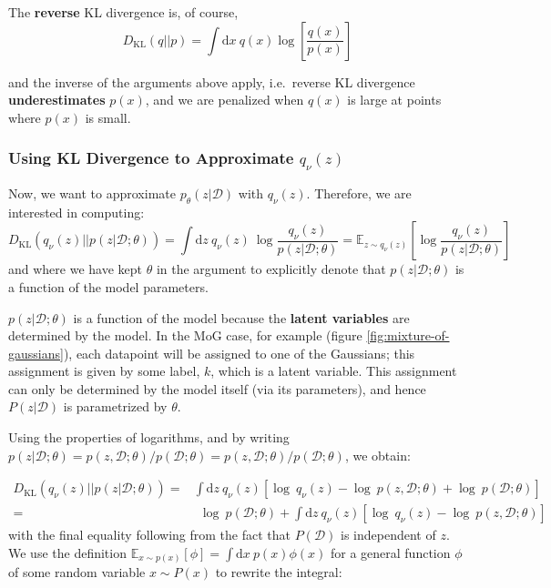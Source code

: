 \documentclass[]{article}
\begin{document}
The \textbf{reverse} KL divergence is, of course,
\begin{equation}\label{eq:backwards_kl}
    D_\text{KL}(q||p) = \int \text{d}x~ q(x)\log\left[\frac{q(x)}{p(x)}\right]
\end{equation}

and the inverse of the arguments above apply, i.e.\ reverse KL divergence \textbf{underestimates} $p(x)$, and we are penalized when $q(x)$ is large at points where $p(x)$ is small.

\subsubsection{Using KL Divergence to Approximate $q_\nu (z)$}

Now, we want to approximate $p_\theta(z|\mathcal{D})$ with $q_\nu(z)$. Therefore, we are interested in computing:
\begin{equation}
    D_\text{KL}(q_\nu(z) || p(z|\mathcal{D}; \theta)) = \int \text{d}z ~ q_\nu(z) ~\log \frac{q_\nu(z)}{p(z|\mathcal{D};\theta)} = \mathbb{E}_{z \sim q_\nu (z)} \left[\log \frac{q_\nu (z)}{p(z|\mathcal{D}; \theta)} \right]
\end{equation}
and where we have kept $\theta$ in the argument to explicitly denote that $p(z|\mathcal{D};\theta)$ is a function of the model parameters. 

$p(z|\mathcal{D} ;\theta)$ is a function of the model because the \textbf{latent variables} are determined by the model. In the MoG case, for example (figure \ref{fig:mixture-of-gaussians}), each datapoint will be assigned to one of the Gaussians; this assignment is given by some label, $k$, which is a latent variable. This assignment can only be determined by the model itself (via its parameters), and hence $P(z|\mathcal{D})$ is parametrized by $\theta$.

Using the properties of logarithms, and by writing $p(z|\mathcal{D};\theta) = p(z, \mathcal{D} ;\theta)/p(\mathcal{D};\theta) = p(z, \mathcal{D} ;\theta)/p(\mathcal{D};\theta)$, we obtain:

\begin{align}
    D_\text{KL}(q_\nu(z) || p(z|\mathcal{D};\theta)) = &\int \text{d}z~q_\nu(z)\left[\log~q_\nu(z) - \log~p(z, \mathcal{D};\theta) + \log~p(\mathcal{D};\theta) \right] \\
    = &~~ \log~p(\mathcal{D};\theta) + \int \text{d}z~q_\nu(z)\left[\log~q_\nu(z) - \log~p(z, \mathcal{D};\theta) \right]
\end{align}
with the final equality following from the fact that $P(\mathcal{D})$ is independent of $z$. We use the definition $\mathbb{E}_{x\sim p(x)}[\phi] = \int \text{d}x ~ p(x) \phi(x)$ for a general function $\phi$ of some random variable $x\sim P(x)$ to rewrite the integral:
\end{document}
